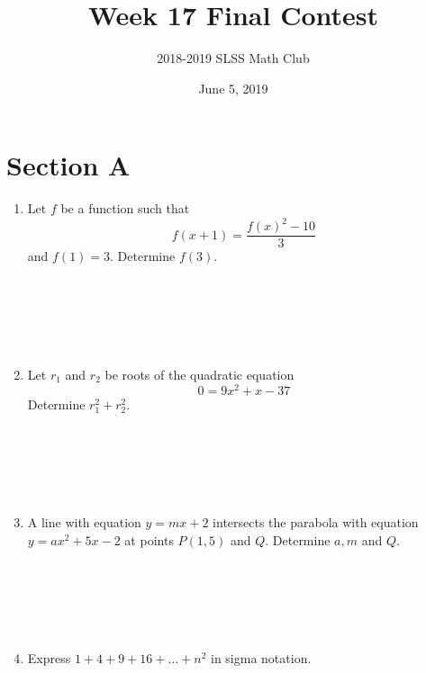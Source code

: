 \documentclass[12pt]{article}
\title{Week 17 Final Contest\vspace{-3mm}}
\author{2018-2019 SLSS Math Club\vspace{-5mm}}
\date{June 5, 2019\vspace{-5mm}}
\begin{document}
\maketitle

\newcommand{\aspace}{\\ \\ \\ \\ \\ \\} 
\newcommand{\bspace}{\\ \\ \\ \\ \\ \\ \\ \\ \\ \\}
\newcommand{\cspace}{\\ \\ \\ \\ \\ \\ \\ \\ \\ \\ \\ \\ \\}

\section*{Section A}
\begin{enumerate}
    \item Let $f$ be a function such that $$f(x + 1) = \frac{f(x)^2 - 10}{3}$$ and $f(1) = 3$. Determine $f(3)$. \aspace
    \item Let $r_1$ and $r_2$ be roots of the quadratic equation $$0 = 9x^2 + x - 37$$ Determine $r_1^2 + r_2^2$. \aspace 
    \item A line with equation $y = mx + 2$ intersects the parabola with equation $y = ax^2 + 5x - 2$ at points $P(1, 5)$ and $Q$. Determine $a, m$ and $Q$. \aspace
    \item Express $1 + 4 + 9 + 16 + \dots + n^2$ in sigma notation. \aspace
\end{enumerate}
\end{document}
